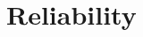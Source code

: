 \documentclass[12pt,a4paper]{report}
\begin{document}
\chapter{Reliability}


\newpage

\appendix







\newpage
{}


%
\label{sec:bibliography}
\end{document}
